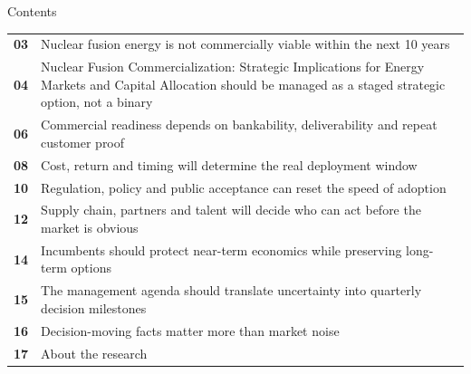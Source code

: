 \documentclass[10pt,a4paper]{article}
\begin{document}
\clearpage
{\sffamily\fontsize{26}{31}\selectfont\color{BONavy} Contents}\par\vspace{10pt}
\begin{tabularx}{\linewidth}{p{14mm}Y}
\textcolor{BOGreen}{\bfseries 03} & Nuclear fusion energy is not commercially viable within the next 10 years \\[5pt]
\textcolor{BOGreen}{\bfseries 04} & Nuclear Fusion Commercialization: Strategic Implications for Energy Markets and Capital Allocation should be managed as a staged strategic option, not a binary \\[5pt]
\textcolor{BOGreen}{\bfseries 06} & Commercial readiness depends on bankability, deliverability and repeat customer proof \\[5pt]
\textcolor{BOGreen}{\bfseries 08} & Cost, return and timing will determine the real deployment window \\[5pt]
\textcolor{BOGreen}{\bfseries 10} & Regulation, policy and public acceptance can reset the speed of adoption \\[5pt]
\textcolor{BOGreen}{\bfseries 12} & Supply chain, partners and talent will decide who can act before the market is obvious \\[5pt]
\textcolor{BOGreen}{\bfseries 14} & Incumbents should protect near-term economics while preserving long-term options \\[5pt]
\textcolor{BOGreen}{\bfseries 15} & The management agenda should translate uncertainty into quarterly decision milestones \\[5pt]
\textcolor{BOGreen}{\bfseries 16} & Decision-moving facts matter more than market noise \\[5pt]
\textcolor{BOGreen}{\bfseries 17} & About the research \\[5pt]
\end{tabularx}
\clearpage
\end{document}
